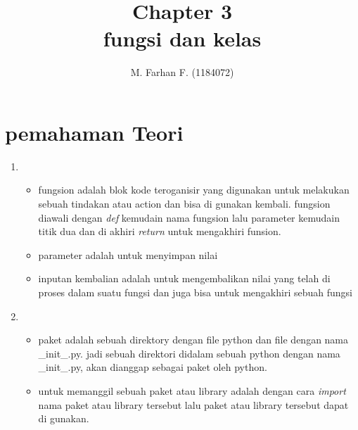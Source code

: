 \documentclass[12pt]{article}
\begin{document}
\title{Chapter 3 \\ fungsi dan kelas}
\author{M. Farhan F. (1184072)}
\date{}
\maketitle

\section{pemahaman Teori}
	\begin{enumerate}
		\item 
			\begin{itemize}
				\item fungsion adalah blok kode teroganisir yang digunakan untuk melakukan sebuah tindakan atau action dan bisa di gunakan kembali. fungsion diawali dengan \textit{def} kemudain nama fungsion lalu parameter kemudain titik dua dan di akhiri \textit{return} untuk mengakhiri funsion.
							
				
				\item parameter adalah untuk menyimpan nilai 
				
				
				\item inputan kembalian adalah untuk mengembalikan nilai yang telah di proses dalam suatu fungsi dan juga bisa untuk mengakhiri sebuah fungsi				
								
				
			\end{itemize}
			
		\item 
			\begin{itemize}
			\item paket adalah sebuah direktory dengan file python dan file dengan nama \_init\_.py. jadi sebuah direktori didalam sebuah python dengan nama \_init\_.py, akan dianggap sebagai paket oleh python.			 
			\item untuk memanggil sebuah paket atau library adalah dengan cara \textit{import} nama paket atau library tersebut lalu paket atau library tersebut dapat di gunakan.
						 			
			 		
			\end{itemize}
			

\end{enumerate}
\end{document}
